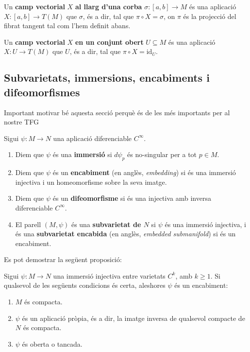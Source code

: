 \begin{defi}
    Un \textbf{camp vectorial} $X$ \textbf{al llarg d'una corba} $\sigma:[a,b]\to M$ és una aplicació $X:[a,b]\to T(M)$ que  $\sigma$, és a dir, tal que $\pi\circ X = \sigma$, on $\pi$ és la projecció del fibrat tangent tal com l'hem definit abans. 

    Un \textbf{camp vectorial} $X$ \textbf{en un conjunt obert} $U\subseteq M$ és una aplicació $X:U\to T(M)$ que  $U$, és a dir, tal que $\pi\circ X = \text{id}_U$.
\end{defi}


\subsection{Subvarietats, immersions, encabiments i difeomorfismes}
{\color{blue} Important motivar bé aquesta secció perquè és de les més importants per al nostre TFG}
\begin{defi}
    Sigui $\psi:M\to N$ una aplicació diferenciable {\color{blue} $C^\infty$}.
    \begin{enumerate}
        \item Diem que $\psi$ és una \textbf{immersió} si $d\psi_p$ és no-singular per a tot $p\in M$.
        \item Diem que $\psi$ és un \textbf{encabiment} (en anglès, \textit{embedding}) si és una immersió injectiva i un homeomorfisme sobre la seva imatge.
        \item Diem que $\psi$ és un \textbf{difeomorfisme} si és una injectiva amb inversa diferenciable {\color{blue} $C^\infty$}.
        \item El parell $(M, \psi)$ és una \textbf{subvarietat de $N$} si $\psi$ és una immersió injectiva, i és una \textbf{subvarietat encabida} (en anglès, \textit{embedded submanifold}) si és un encabiment.
    \end{enumerate}
\end{defi}

Es pot demostrar la següent proposició:
\begin{prop}\label{prop:encabiment_immersio}
    Sigui $\psi:M\to N$ una immersió injectiva entre varietats $C^k$, amb $k\ge 1$. Si qualsevol de les següents condicions és certa, aleshores $\psi$ és un encabiment:
    \begin{enumerate}
        \item $M$ és compacta.
        \item $\psi$ és un aplicació pròpia, és a dir, la imatge inversa de qualsevol compacte de $N$ és compacta.
        \item $\psi$ és oberta o tancada.
    \end{enumerate}
\end{prop}

